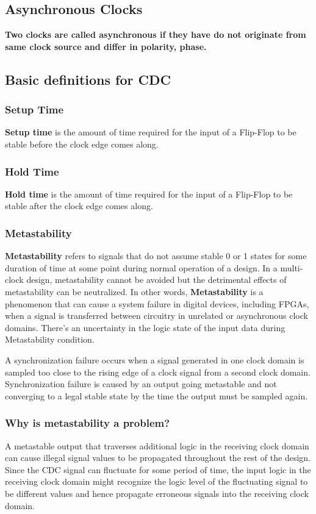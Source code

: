 \subsection{Asynchronous Clocks}
\textbf{Two clocks are called asynchronous if they have do not originate from same clock source and differ in polarity, phase.}


\subsection{Basic definitions for CDC}
\subsubsection{Setup Time} 
\textbf{Setup time} is the amount of time required for the input of a Flip-Flop to be stable before the clock edge comes along.

\subsubsection{Hold Time}
\textbf{Hold time} is the amount of time required for the input of a Flip-Flop to be stable after the clock edge comes along.

\subsubsection{Metastability}
\textbf{Metastability} refers to signals that do not assume stable 0 or 1 states for some duration of time at some point during normal operation of a design. In a multi-clock design, metastability cannot be avoided but the detrimental effects of metastability can be neutralized. In other words, \textbf{Metastability} is a phenomenon that can cause a system failure in digital devices, including FPGAs, when a signal is transferred between circuitry in unrelated or asynchronous clock domains. There's an uncertainty in the logic state of the input data during Metastability condition.

\par A synchronization failure occurs when a signal generated in one clock domain is sampled too close to the rising edge of a clock signal from a second clock domain. Synchronization failure is caused by an output going metastable and not converging to a legal stable state by the time the output must be sampled again.

\subsubsection{Why is metastability a problem?}
A metastable output that traverses additional logic in the receiving clock domain can cause illegal signal values to be propagated throughout the rest of the design.\\
Since the CDC signal can fluctuate for some period of time, the input logic in the receiving clock domain might recognize the logic level of the fluctuating signal to be different values and hence propagate erroneous signals into the receiving clock domain.

